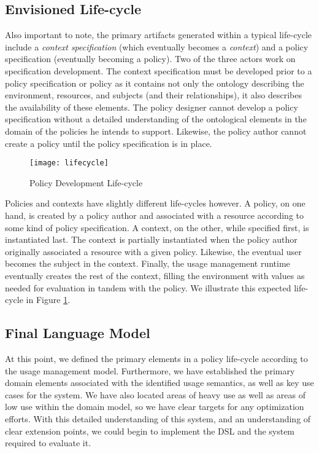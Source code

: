 \subsection{Envisioned Life-cycle}
Also important to note, the primary artifacts generated within a typical life-cycle include a \emph{context specification} (which eventually becomes a \emph{context}) and a policy specification (eventually becoming a policy).  Two of the three actors work on specification development.  The context specification must be developed prior to a policy specification or policy as it contains not only the ontology describing the environment, resources, and subjects (and their relationships), it also describes the availability of these elements.  The policy designer cannot develop a policy specification without a detailed understanding of the ontological elements in the domain of the policies he intends to support.  Likewise, the policy author cannot create a policy until the policy specification is in place.

\begin{figure}[!t]
\centering
\texttt{[image: lifecycle]}
\caption{Policy Development Life-cycle}
\label{fig:model:lifecycle}
\end{figure}

Policies and contexts have slightly different life-cycles however.  A policy, on one hand, is created by a policy author and associated with a resource according to some kind of policy specification.  A context, on the other, while specified first, is instantiated last.  The context is partially instantiated when the policy author originally associated a resource with a given policy.  Likewise, the eventual user becomes the subject in the context.  Finally, the usage management runtime eventually creates the rest of the context, filling the environment with values as needed for evaluation in tandem with the policy.  We illustrate this expected life-cycle in Figure \ref{fig:model:lifecycle}.

\subsection{Final Language Model}
At this point, we defined the primary elements in a policy life-cycle according to the usage management model.  Furthermore, we have established the primary domain elements associated with the identified usage semantics, as well as key use cases for the system.  We have also located areas of heavy use as well as areas of low use within the domain model, so we have clear targets for any optimization efforts.  With this detailed understanding of this system, and an understanding of clear extension points, we could begin to implement the DSL and the system required to evaluate it.